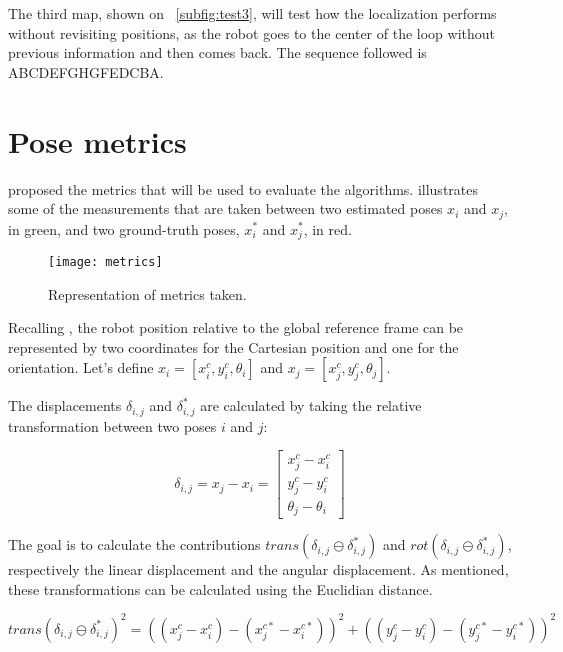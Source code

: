 The third map, shown on \figurename~\ref{subfig:test3}, will test how the localization performs without revisiting positions, as the robot goes to the center of the loop without previous information and then comes back. The sequence followed is ABCDEFGHGFEDCBA.

\section{Pose metrics} \label{sec:metrics}

 proposed the metrics that will be used to evaluate the algorithms.  illustrates some of the measurements that are taken between two estimated poses $x_i$ and $x_j$, in green, and two ground-truth poses, $x_i^*$ and $x_j^*$, in red.

\begin{figure}[!ht]
    \centering
    \texttt{[image: metrics]}
    \caption{Representation of metrics taken.}
    \label{fig:metrics}
\end{figure}

Recalling , the robot position relative to the global reference frame can be represented by two coordinates for the Cartesian position and one for the orientation. Let's define $x_i = [x^c_i, y^c_i, \theta_i]$ and $x_j = [x^c_j, y^c_j, \theta_j]$.

The displacements $\delta_{i,j}$ and $\delta_{i,j}^*$ are calculated by taking the relative transformation between two poses $i$ and $j$:

\begin{equation}
\delta_{i,j} = x_j - x_i =
\begin{bmatrix}
x^c_j - x^c_i \\
y^c_j - y^c_i \\
\theta_j - \theta_i
\end{bmatrix}
\end{equation}

The goal is to calculate the contributions $trans(\delta_{i,j} \ominus \delta_{i,j}^*)$ and $rot(\delta_{i,j} \ominus \delta_{i,j}^*)$, respectively the linear displacement and the angular displacement. As mentioned, these transformations can be calculated using the Euclidian distance.

\begin{equation}
trans(\delta_{i,j} \ominus \delta_{i,j}^*)^2 =
((x^c_j - x^c_i) - (x^{c*}_j - x^{c*}_i))^2 + 
((y^c_j - y^c_i) - (y^{c*}_j - y^{c*}_i))^2
\end{equation}

